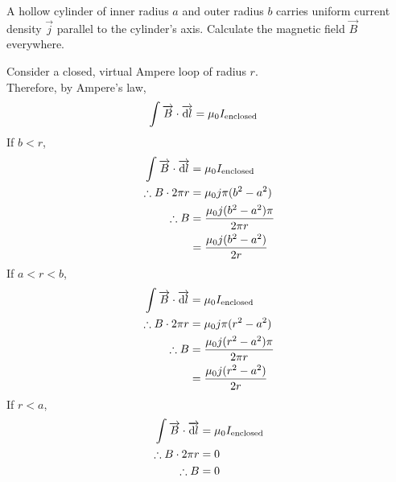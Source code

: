 \documentclass[fleqn, a4paper, 12pt, twoside]{article}
\theoremstyle{definition}
\theoremstyle{theorem}
\begin{document}
\begin{question}
	A hollow cylinder of inner radius $a$ and outer radius $b$ carries uniform current density ⃗$\overrightarrow{j}$ parallel to the cylinder's axis.
	Calculate the magnetic field $\overrightarrow{B}$ everywhere.
\end{question}

\begin{solution}
	Consider a closed, virtual Ampere loop of radius $r$.\\
	Therefore, by Ampere's law,
	\begin{align*}
		\int \overrightarrow{B} \cdot \overrightarrow{\dif l} & = \mu_0 I_{\textnormal{enclosed}}
	\end{align*}
	If $b < r$,
	\begin{align*}
		\int \overrightarrow{B} \cdot \overrightarrow{\dif l} & = \mu_0 I_{\textnormal{enclosed}}         \\
		\therefore B \cdot 2 \pi r                            & = \mu_0 j \pi (b^2 - a^2)                 \\
		\therefore B                                          & = \frac{\mu_0 j (b^2 - a^2) \pi}{2 \pi r} \\
                                                                      & = \frac{\mu_0 j (b^2 - a^2)}{2 r}
	\end{align*}
	If $a < r < b$,
	\begin{align*}
		\int \overrightarrow{B} \cdot \overrightarrow{\dif l} & = \mu_0 I_{\textnormal{enclosed}}         \\
		\therefore B \cdot 2 \pi r                            & = \mu_0 j \pi (r^2 - a^2)                 \\
		\therefore B                                          & = \frac{\mu_0 j (r^2 - a^2) \pi}{2 \pi r} \\
                                                                      & = \frac{\mu_0 j (r^2 - a^2)}{2 r}
	\end{align*}
	If $r < a$,
	\begin{align*}
		\int \overrightarrow{B} \cdot \overrightarrow{\dif l} & = \mu_0 I_{\textnormal{enclosed}} \\
		\therefore B \cdot 2 \pi r                            & = 0                               \\
		\therefore B                                          & = 0
	\end{align*}
\end{solution}
\end{document}
